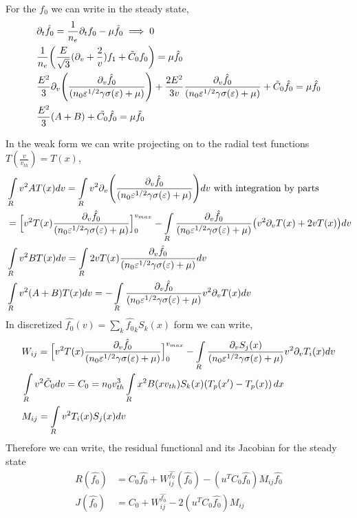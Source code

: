 \documentclass{article}[draft]
\begin{document}
For the $f_0$ we can write in the steady state, 
\begin{align*}
&\partial_t \hat{f_0} = \frac{1}{n_e} \partial_t f_0 - \mu \hat{f_0} \implies 0 \\
&\frac{1}{n_e} \of{\frac{E}{\sqrt{3}}(\partial_v +  \frac{2}{v})f_1 + \tilde C_0 f_0} = \mu \hat{f_0} \\
&\frac{E^2}{3} \partial_{v} \of{\frac{\partial_v \hat f_0}{(n_0 \varepsilon^{1/2}\gamma \sigma\of{\varepsilon} + \mu)}} + \frac{2E^2}{3v} \frac{\partial_v \hat{f_0}}{(n_0 \varepsilon^{1/2}\gamma \sigma\of{\varepsilon} + \mu)} + \tilde C_0 \hat{f_0} = \mu \hat{f_0}\\
&\frac{E^2}{3} \of{ A + B} + \tilde{C_0}\hat{f_0} = \mu \hat{f_0}
\end{align*}

In the weak form we can write projecting on to the radial test functions $T(\frac{v}{v_{th}}) = T(x)$, 
\begin{align*}
&\myint_{R} v^2 A T(x) dv = \myint_{R} v^2 \partial_{v} \of{\frac{\partial_v \hat f_0}{(n_0 \varepsilon^{1/2}\gamma \sigma\of{\varepsilon} + \mu)}} dv \text{ with integration by parts}\\
&= \Big[v^2 T(x) \frac{\partial_v \hat f_0}{(n_0 \varepsilon^{1/2}\gamma \sigma\of{\varepsilon} + \mu)}\Big]_0^{v_{max}} - \myint_{R} \frac{\partial_v \hat f_0}{(n_0 \varepsilon^{1/2}\gamma \sigma\of{\varepsilon} + \mu)} \of{v^2 \partial_v T(x) + 2v T(x)} dv \\
&\myint_{R} v^2 B T(x) dv = \myint_{R} 2v T(x)\frac{\partial_v \hat{f_0}}{(n_0 \varepsilon^{1/2}\gamma \sigma\of{\varepsilon} + \mu)} dv \\
&\myint_{R} v^2 (A + B) T(x) dv = -\myint_{R} \frac{\partial_v \hat f_0}{(n_0 \varepsilon^{1/2}\gamma \sigma\of{\varepsilon} + \mu)} v^2 \partial_v T(x) dv
\end{align*}
In discretized $\hat{f_0}(v) = \sum_{k} \hat{f_0}_k S_k(x)$ form we can write, 
\begin{align*}
&W_{ij} = \Big[v^2 T(x) \frac{\partial_v \hat f_0}{(n_0 \varepsilon^{1/2}\gamma \sigma\of{\varepsilon} + \mu)}\Big]_0^{v_{max}}-\myint_{R} \frac{\partial_v S_j(x)}{(n_0 \varepsilon^{1/2}\gamma \sigma\of{\varepsilon} + \mu)} v^2 \partial_v T_i(x) dv \\
&\myint_{R} v^2 \tilde{C}_0 dv = C_{0}  = n_0 v_{th}^3 \myint_{R} x^2 B(x v_{th}) S_k\of{x}  \of{T_p\of{x^\prime} - T_p\of{x}} \diff{x}  \\
&M_{ij} = \myint_{R} v^2 T_i(x) S_j(x) dv\\
\end{align*} Therefore we can write, the residual functional and its Jacobian for the steady state 
\begin{align*}
R(\hat{f_0}) &= C_0 \hat{f_0} + W^{\hat{f_0}}_{ij} (\hat{f_0}) - (u^T C_0 \hat{f_0}) M_{ij} \hat{f_0} \\
J(\hat{f_0}) &= C_0 + W^{\hat{f_0}}_{ij}  - 2(u^T C_0 \hat{f_0}) M_{ij}
\end{align*}
\end{document}
